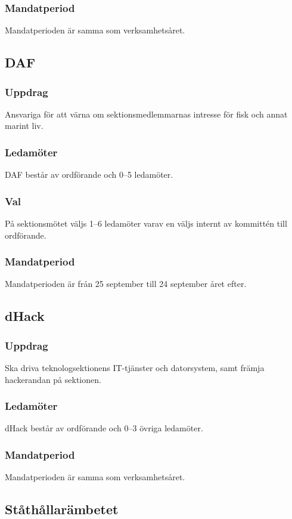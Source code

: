 \subsubsection{Mandatperiod}
Mandatperioden är samma som verksamhetsåret. 

\subsection{DAF}
\subsubsection{Uppdrag}
Ansvariga för att värna om sektionsmedlemmarnas intresse för fisk och
annat marint liv.
\subsubsection{Ledamöter}
DAF består av ordförande och 0--5 ledamöter. 
\subsubsection{Val}
På sektionsmötet väljs 1--6 ledamöter varav en väljs internt av kommittén till ordförande.
\subsubsection{Mandatperiod}
Mandatperioden är från 25 september till 24 september året efter.

\subsection{dHack}
\subsubsection{Uppdrag}
Ska driva teknologsektionens IT-tjänster och datorsystem, samt
främja hackerandan på sektionen.
\subsubsection{Ledamöter}
dHack består av ordförande och 0--3 övriga ledamöter.
\subsubsection{Mandatperiod}
Mandatperioden är samma som verksamhetsåret.

\subsection{Ståthållarämbetet}
